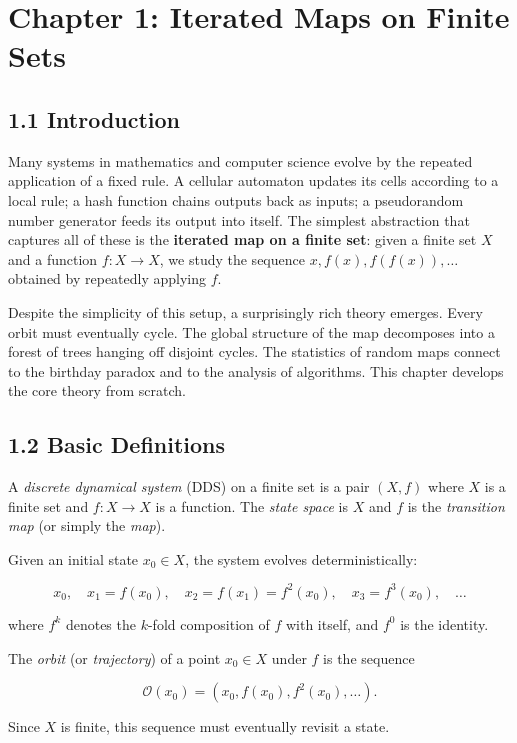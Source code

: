 \chapter{Chapter 1: Iterated Maps on Finite Sets}

\section{1.1 Introduction}

Many systems in mathematics and computer science evolve by the repeated application of a fixed rule. A cellular automaton updates its cells according to a local rule; a hash function chains outputs back as inputs; a pseudorandom number generator feeds its output into itself. The simplest abstraction that captures all of these is the \textbf{iterated map on a finite set}: given a finite set $X$ and a function $f: X \to X$, we study the sequence $x, f(x), f(f(x)), \ldots$ obtained by repeatedly applying $f$.

Despite the simplicity of this setup, a surprisingly rich theory emerges. Every orbit must eventually cycle. The global structure of the map decomposes into a forest of trees hanging off disjoint cycles. The statistics of random maps connect to the birthday paradox and to the analysis of algorithms. This chapter develops the core theory from scratch.

\section{1.2 Basic Definitions}

\begin{definition}
A \textit{discrete dynamical system} (DDS) on a finite set is a pair $(X, f)$ where $X$ is a finite set and $f: X \to X$ is a function. The \textit{state space} is $X$ and $f$ is the \textit{transition map} (or simply the \textit{map}).

Given an initial state $x_0 \in X$, the system evolves deterministically:

\[
x_0, \quad x_1 = f(x_0), \quad x_2 = f(x_1) = f^2(x_0), \quad x_3 = f^3(x_0), \quad \ldots
\]

where $f^k$ denotes the $k$-fold composition of $f$ with itself, and $f^0$ is the identity.
\end{definition}

\begin{definition}[Orbit]
The \textit{orbit} (or \textit{trajectory}) of a point $x_0 \in X$ under $f$ is the sequence

\[
\mathcal{O}(x_0) = (x_0, f(x_0), f^2(x_0), \ldots).
\]

Since $X$ is finite, this sequence must eventually revisit a state.
\end{definition}


